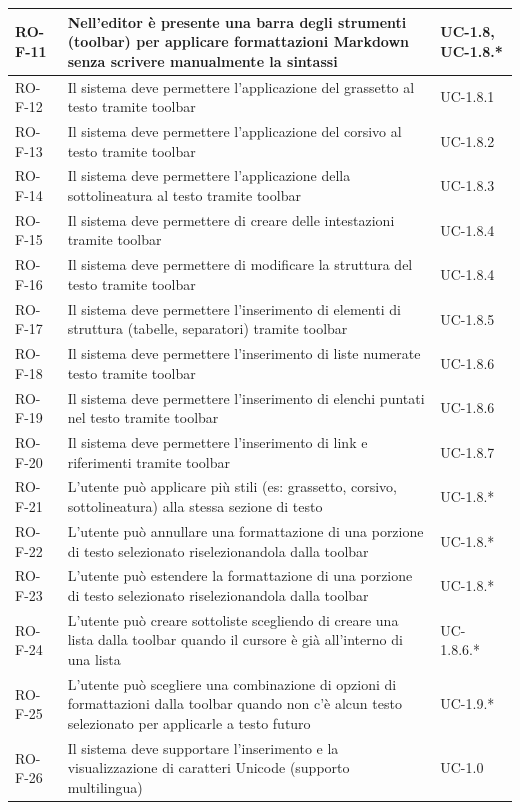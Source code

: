 \documentclass[11pt,a4paper]{article}
\begin{document}
\begin{longtable}{|p{}|>{\raggedright\arraybackslash}p{}|p{}|}
\hline
RO-F-11 & Nell'editor è presente una barra degli strumenti (toolbar) per applicare formattazioni Markdown senza scrivere manualmente la sintassi & UC-1.8, UC-1.8.* \\
\hline
RO-F-12 & Il sistema deve permettere l'applicazione del grassetto al testo tramite toolbar & UC-1.8.1 \\
\hline
RO-F-13 & Il sistema deve permettere l'applicazione del corsivo al testo tramite toolbar & UC-1.8.2 \\
\hline
RO-F-14 & Il sistema deve permettere l'applicazione della sottolineatura al testo tramite toolbar & UC-1.8.3 \\
\hline
RO-F-15 & Il sistema deve permettere di creare delle intestazioni tramite toolbar & UC-1.8.4 \\
\hline
RO-F-16 & Il sistema deve permettere di modificare la struttura del testo tramite toolbar & UC-1.8.4 \\
\hline
RO-F-17 & Il sistema deve permettere l'inserimento di elementi di struttura (tabelle, separatori) tramite toolbar & UC-1.8.5 \\
\hline
RO-F-18 & Il sistema deve permettere l'inserimento di liste numerate testo tramite toolbar & UC-1.8.6 \\
\hline
RO-F-19 & Il sistema deve permettere l'inserimento di elenchi puntati nel testo tramite toolbar & UC-1.8.6 \\
\hline
RO-F-20 & Il sistema deve permettere l'inserimento di link e riferimenti tramite toolbar & UC-1.8.7 \\
\hline
RO-F-21 & L'utente può applicare più stili (es: grassetto, corsivo, sottolineatura) alla stessa sezione di testo & UC-1.8.* \\
\hline
RO-F-22 & L'utente può annullare una formattazione di una porzione di testo selezionato riselezionandola dalla toolbar & UC-1.8.* \\
\hline
RO-F-23 & L'utente può estendere la formattazione di una porzione di testo selezionato riselezionandola dalla toolbar & UC-1.8.* \\
\hline
RO-F-24 & L'utente può creare sottoliste scegliendo di creare una lista dalla toolbar quando il cursore è già all'interno di una lista  & UC-1.8.6.* \\
\hline
RO-F-25 & L'utente può scegliere una combinazione di opzioni di formattazioni dalla toolbar quando non c'è alcun testo selezionato per applicarle a testo futuro & UC-1.9.* \\
\hline
RO-F-26 & Il sistema deve supportare l'inserimento e la visualizzazione di caratteri Unicode (supporto multilingua) & UC-1.0 \\

\end{longtable}
\end{document}
